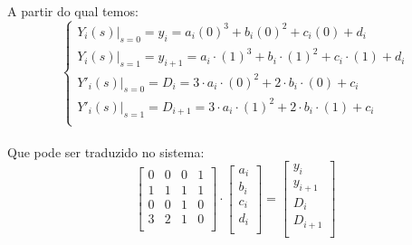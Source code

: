 \documentclass[a4paper,11pt]{article}
\begin{document}
\paragraph{}A partir do qual temos:
\begin{equation}
\left\{
\begin{array}{l}
Y_i(s)|_{s=0} = y_i =  a_i (0)^3 + b_i (0)^2 + c_i (0) + d_i \\
Y_i(s)|_{s=1} = y_{i+1} =  a_i\cdot (1)^3 + b_i\cdot (1)^2 + c_i\cdot (1) + d_i\\
Y'_i(s)|_{s=0} = D_i = 3\cdot a_i\cdot (0)^2 + 2\cdot b_i \cdot (0) + c_i\\
Y'_i(s)|_{s=1} = D_{i+1} = 3\cdot a_i\cdot (1)^2 + 2\cdot b_i \cdot (1) + c_i\\
\end{array}
\right.
\end{equation}
\paragraph{}Que pode ser traduzido no sistema:
\begin{equation}
\left[
\begin{array}{cccc}
 0 & 0 & 0 & 1 \\
 1 & 1 & 1 & 1 \\
 0 & 0 & 1 & 0 \\
 3 & 2 & 1 & 0 \\
\end{array}
\right]
\cdot
\left[
\begin{array}{c}
a_i\\b_i\\c_i\\d_i\\
\end{array}
\right]
= 
\left[
\begin{array}{c}
y_i\\y_{i+1}\\D_i\\D_{i+1}\\
\end{array}
\right]
\end{equation}
\end{document}
